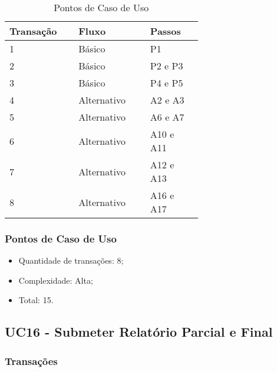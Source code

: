 \begin{table*}[!h]
\centering
\caption{Pontos de Caso de Uso}
\label{Rotulo}
  \begin{tabular}{|p{0.20\linewidth}|p{0.25\linewidth}|p{0.20\linewidth}|}
  \hline
  \textbf{Transação} & \textbf{Fluxo} & \textbf{Passos} \\ 
  \hline
  1 & Básico & P1\\
  \hline
  2 & Básico & P2 e P3\\
  \hline
  3 & Básico & P4 e P5\\
  \hline
  4 & Alternativo & A2 e A3\\
  \hline
  5 & Alternativo & A6 e A7\\
  \hline
  6 & Alternativo & A10 e A11\\
  \hline
  7 & Alternativo & A12 e A13\\
  \hline
  8 & Alternativo & A16 e A17\\
  \hline
  \end{tabular}
\end{table*}

\pagebreak
\subsubsection{Pontos de Caso de Uso}

\begin{itemize}
 \item Quantidade de transações: 8;
 \item Complexidade: Alta;
 \item Total: 15.
\end{itemize}

\subsection{UC16 - Submeter Relatório Parcial e Final}

\subsubsection{Transações}

